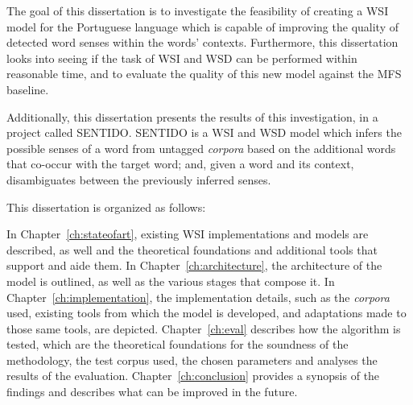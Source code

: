 
The goal of this dissertation is to investigate the feasibility of creating a
\ac{WSI} model for the Portuguese language which is capable of improving the
quality of detected word senses within the words' contexts. Furthermore, this
dissertation looks into seeing if the task of \ac{WSI} and \ac{WSD} can be
performed within reasonable time, and to evaluate the quality of this new model
against the \ac{MFS} baseline.


Additionally, this dissertation presents the results of this investigation, in
a project called \ac{SENTIDO}. \ac{SENTIDO} is a \ac{WSI} and \ac{WSD} model
which infers the possible senses of a word from untagged \emph{corpora} based
on the additional words that co-occur with the target word; and, given a word
and its context, disambiguates between the previously inferred senses.


This dissertation is organized as follows:

In Chapter~\ref{ch:stateofart}, existing \ac{WSI} implementations and models
are described, as well and the theoretical foundations and additional tools
that support and aide them. In Chapter~\ref{ch:architecture}, the architecture
of the model is outlined, as well as the various stages that compose it. In
Chapter~\ref{ch:implementation}, the implementation details, such as the
\emph{corpora} used, existing tools from which the model is developed, and
adaptations made to those same tools, are depicted.
Chapter~\ref{ch:eval} describes how the algorithm is tested, which are the
theoretical foundations for the soundness of the methodology, the test corpus
used, the chosen parameters and analyses the results of the evaluation.
Chapter~\ref{ch:conclusion} provides a synopsis of the findings and describes
what can be improved in the future.

